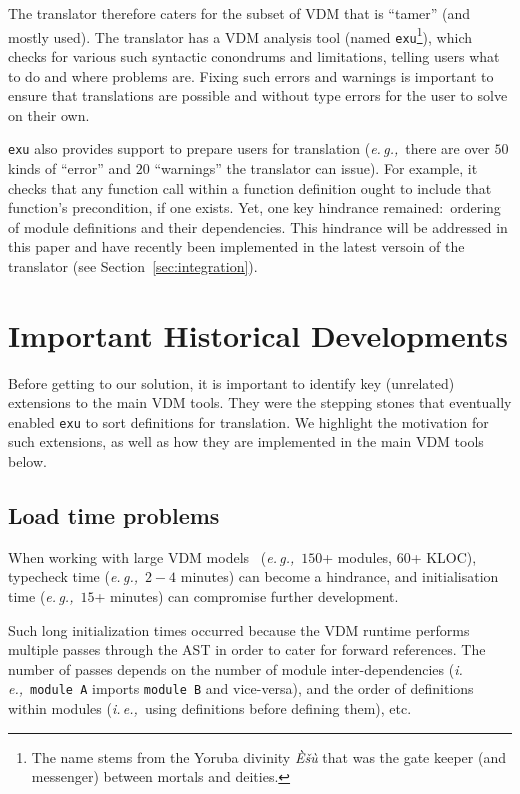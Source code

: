 \documentclass[runningheads,a4paper]{llncs}
\newcommand{\eg}{{\em e.\,g.,\/}}
\newcommand{\ie}{{\em i.\,e.,\/}}
\begin{document}
The translator therefore caters for the subset of VDM that is ``tamer'' (and mostly used). The translator has a VDM analysis tool (named \texttt{exu}\footnote{The name stems from the Yoruba divinity \textit{\`{E}\v{s}\`{u}} that was the gate keeper (and messenger) between mortals and deities.}), which checks for various such syntactic conondrums and limitations, telling users what to do and where problems are. Fixing such errors and warnings is important to ensure that translations are possible and without type errors for the user to solve on their own.  

\texttt{exu} also provides support to prepare users for translation (\eg~there are over \(50\) kinds of ``error'' and \(20\) ``warnings'' the translator can issue). For example, it checks that any function call within a function definition ought to include that function's precondition, if one exists. Yet, one key hindrance remained:~ordering of module definitions and their dependencies. This hindrance will be addressed in this paper and have recently been implemented in the latest versoin of the translator (see Section~\ref{sec:integration}). 


\section{Important Historical Developments}\label{sec:history}

Before getting to our solution, it is important to identify key (unrelated) extensions to the main VDM tools. They were the stepping stones that eventually enabled \texttt{exu} to sort definitions for translation. We highlight the motivation for such extensions, as well as how they are implemented in the main VDM tools below.

\subsection{Load time problems}

When working with large VDM models~\cite{emv2} (\eg~\(150\)+ modules, \(60\)+ KLOC), typecheck time (\eg~\(2-4\) minutes) can become a hindrance, and initialisation time (\eg~\(15\)+ minutes) can compromise further development. 

Such long initialization times occurred because the VDM runtime performs multiple passes through the AST in order to cater for forward references. The number of passes depends on the number of module inter-dependencies (\ie~\texttt{module A} imports \texttt{module B} and vice-versa), and the order of definitions within modules (\ie~using definitions before defining them), etc. 
\end{document}
